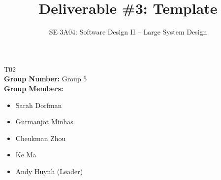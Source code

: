 \documentclass[]{article}
\title{Deliverable \#3: Template}
\author{SE 3A04: Software Design II -- Large System Design}
\date{}
\numberwithin{figure}{section} %
\begin{document}
\maketitle	
{} T02\\
{\bf Group Number:} Group 5 \\
{\bf Group Members:} 
\begin{itemize}
	\item Sarah Dorfman
	\item Gurmanjot Minhas
	\item Cheukman Zhou
	\item Ke Ma
	\item Andy Huynh (Leader)
\end{itemize}

















\end{document}
